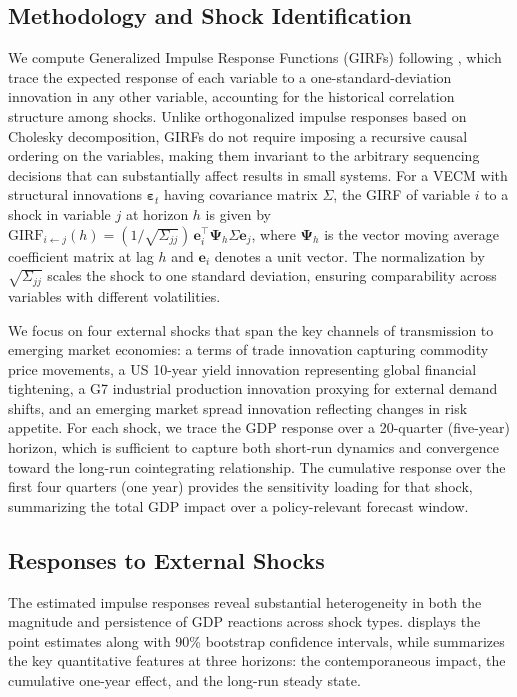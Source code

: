 \documentclass[12pt,a4paper]{article}
\numberwithin{equation}{section}
\theoremstyle{definition}
\theoremstyle{remark}
\newcommand{\vect}[1]{\boldsymbol{#1}}
\begin{document}
\subsection{Methodology and Shock Identification}

We compute Generalized Impulse Response Functions (GIRFs) following \textcite{pesaran1998generalized}, which trace the expected response of each variable to a one-standard-deviation innovation in any other variable, accounting for the historical correlation structure among shocks. Unlike orthogonalized impulse responses based on Cholesky decomposition, GIRFs do not require imposing a recursive causal ordering on the variables, making them invariant to the arbitrary sequencing decisions that can substantially affect results in small systems. For a VECM with structural innovations $\vect{\varepsilon}_t$ having covariance matrix $\Sigma$, the GIRF of variable $i$ to a shock in variable $j$ at horizon $h$ is given by $\text{GIRF}_{i \leftarrow j}(h) = (1/\sqrt{\Sigma_{jj}}) \, \vect{e}_i^\top \vect{\Psi}_h \Sigma \vect{e}_j$, where $\vect{\Psi}_h$ is the vector moving average coefficient matrix at lag $h$ and $\vect{e}_i$ denotes a unit vector. The normalization by $\sqrt{\Sigma_{jj}}$ scales the shock to one standard deviation, ensuring comparability across variables with different volatilities.

We focus on four external shocks that span the key channels of transmission to emerging market economies: a terms of trade innovation capturing commodity price movements, a US 10-year yield innovation representing global financial tightening, a G7 industrial production innovation proxying for external demand shifts, and an emerging market spread innovation reflecting changes in risk appetite. For each shock, we trace the GDP response over a 20-quarter (five-year) horizon, which is sufficient to capture both short-run dynamics and convergence toward the long-run cointegrating relationship. The cumulative response over the first four quarters (one year) provides the sensitivity loading for that shock, summarizing the total GDP impact over a policy-relevant forecast window.


\subsection{Responses to External Shocks}

The estimated impulse responses reveal substantial heterogeneity in both the magnitude and persistence of GDP reactions across shock types.  displays the point estimates along with 90\% bootstrap confidence intervals, while  summarizes the key quantitative features at three horizons: the contemporaneous impact, the cumulative one-year effect, and the long-run steady state.
\end{document}
